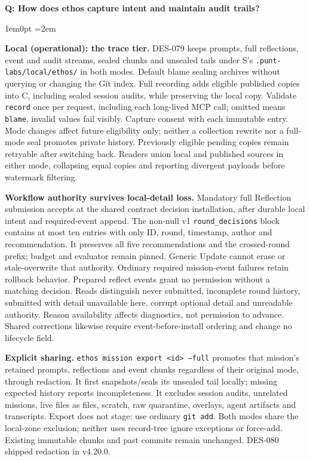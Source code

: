 \documentclass[11pt,letterpaper]{article}
\newcounter{faqnum}
\newenvironment{faqpair}[1]{%
  \needspace{4\baselineskip}%
  \vspace{0.5em}%
  \refstepcounter{faqnum}%
  \noindent\textbf{\color{SectionBlue}Q\thefaqnum: #1}\par\nopagebreak[4]%
  \vspace{0.2em}%
  \begin{adjustwidth}{1em}{0pt}%
  \setlength{\parindent}{0pt}%
  \emergencystretch=2em%
}{%
  \end{adjustwidth}%
  \vspace{0.5em}%
}
\begin{document}
\begin{faqpair}{How does ethos capture intent and maintain audit trails?}
\textbf{Local (operational): the trace tier.} DES-079 keeps prompts, full reflections, event and audit streams, sealed chunks and unsealed tails under S's {\small\texttt{.punt-labs/local/ethos/}} in both modes. Default blame sealing archives without querying or changing the Git index. Full recording adds eligible published copies into C, including sealed session audits, while preserving the local copy. Validate {\small\texttt{record}} once per request, including each long-lived MCP call; omitted means {\small\texttt{blame}}, invalid values fail visibly. Capture consent with each immutable entry. Mode changes affect future eligibility only; neither a collection rewrite nor a full-mode seal promotes private history. Previously eligible pending copies remain retryable after switching back. Readers union local and published sources in either mode, collapsing equal copies and reporting divergent payloads before watermark filtering.

\textbf{Workflow authority survives local-detail loss.} Mandatory full Reflection submission accepts at the shared contract decision installation, after durable local intent and required-event append. The non-null v1 {\small\texttt{round\_decisions}} block contains at most ten entries with only ID, round, timestamp, author and recommendation. It preserves all five recommendations and the crossed-round prefix; budget and evaluator remain pinned. Generic Update cannot erase or stale-overwrite that authority. Ordinary required mission-event failures retain rollback behavior. Prepared reflect events grant no permission without a matching decision. Reads distinguish never submitted, incomplete round history, submitted with detail unavailable here, corrupt optional detail and unreadable authority. Reason availability affects diagnostics, not permission to advance. Shared corrections likewise require event-before-install ordering and change no lifecycle field.

\textbf{Explicit sharing.} {\small\texttt{ethos mission export <id> --full}} promotes that mission's retained prompts, reflections and event chunks regardless of their original mode, through redaction. It first snapshots/seals its unsealed tail locally; missing expected history reports incompleteness. It excludes session audits, unrelated missions, live files as files, scratch, raw quarantine, overlays, agent artifacts and transcripts. Export does not stage: use ordinary {\small\texttt{git add}}. Both modes share the local-zone exclusion; neither uses record-tree ignore exceptions or force-add. Existing immutable chunks and past commits remain unchanged. DES-080 shipped redaction in v4.20.0.


\end{faqpair}
\end{document}
